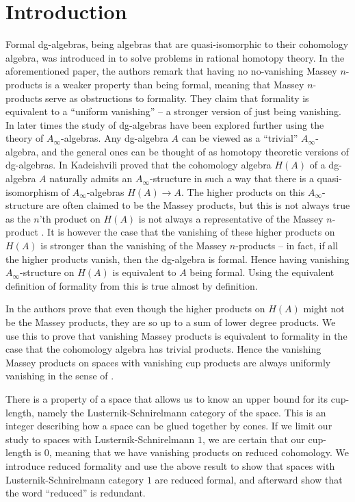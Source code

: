 
\section{Introduction}

Formal dg-algebras, being algebras that are quasi-isomorphic to their cohomology 
algebra, was introduced in \cite{DGMS} to solve problems in rational homotopy theory. In 
the aforementioned paper, the authors remark that having no no-vanishing Massey 
$n$-products is a weaker property than being formal, meaning that Massey $n$-products 
serve as obstructions to formality. They claim that formality is equivalent to a 
``uniform vanishing'' -- a stronger version of just being vanishing. In later times 
the study of dg-algebras have been explored further using the theory of 
$A_\infty$-algebras. Any dg-algebra $A$ can be viewed as a ``trivial'' 
$A_\infty$-algebra, and the general ones can be thought of as homotopy theoretic 
versions of dg-algebras. In \cite{kadeishvili} Kadeishvili proved that the cohomology 
algebra $H(A)$ of a dg-algebra $A$ naturally admits an $A_\infty$-structure in such 
a way that there is a quasi-isomorphism of $A_\infty$-algebras $H(A)\longrightarrow A$. 
The higher products on this $A_\infty$-structure are often claimed to be the Massey 
products, but this is not always true as the $n$'th product on $H(A)$ is not always 
a representative of the Massey $n$-product \cite{detection}. It is however the case that 
the vanishing of these higher products on $H(A)$ is stronger than the vanishing of 
the Massey $n$-products \cite{AHO} -- in fact, if all the higher products vanish, then 
the dg-algebra is formal. Hence having vanishing $A_\infty$-structure on $H(A)$ is 
equivalent to $A$ being formal. Using the equivalent definition of formality from 
\cite{keller} this is true almost by definition. 

In \cite{detection} the authors prove that even though the higher products on $H(A)$ might 
not be the Massey products, they are so up to a sum of lower degree products. We use 
this to prove that vanishing Massey products is equivalent to formality in the case 
that the cohomology algebra has trivial products. Hence the vanishing Massey products 
on spaces with vanishing cup products are always uniformly vanishing in the sense of 
\cite{DGMS}. 

There is a property of a space that allows us to know an upper bound for its 
cup-length, namely the Lusternik-Schnirelmann category of the space. This is an 
integer describing how a space can be glued together by cones. If we limit our study 
to spaces with Lusternik-Schnirelmann $1$, we are certain that our cup-length is $0$, 
meaning that we have vanishing products on reduced cohomology. We introduce reduced 
formality and use the above result to show that spaces with Lusternik-Schnirelmann 
category $1$ are reduced formal, and afterward show that the word ``reduced'' is 
redundant.
